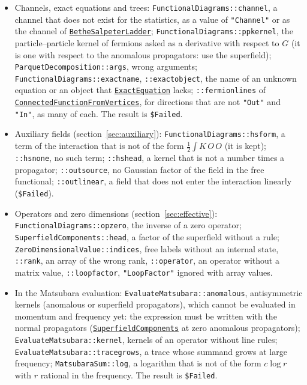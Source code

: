 \documentclass[11pt,a4paper]{article}
\newcommand{\pkg}[1]{\texttt{#1}}
\newcommand{\fnref}[1]{\hyperref[fn:#1]{\pkg{#1}}}
\newcommand{\opt}[1]{\texttt{"#1"}}
\begin{document}
\begin{itemize}
  that are numbers or polynomials in the Feynman parameters, left as it is; \pkg{QEDIntegrand::rule}, \pkg{::external},
  \pkg{::factor}, \pkg{::grassmann}, \pkg{::conservation}, \pkg{::loops}, \pkg{::spinor}, invalid diagrams or rules
  (\pkg{\$Failed}); \pkg{IntegrateOneLoop::loops}, \pkg{::momentum}, \pkg{::numerator}, \pkg{::power}, an integral left
  unevaluated; \pkg{ExpandParameterIntegrals::ir}, \pkg{::failed}, an integral that is not expanded (\pkg{\$Failed});
  \pkg{ParameterIntegral::threshold} and \pkg{SimplexIntegral::threshold}, an integrand with a power $\le-1$ of a base
  that vanishes in the region, above a threshold, which \pkg{N} does not integrate (the result is \pkg{Indeterminate}); \pkg{VertexFormFactors::rest}, a vertex that is not of the form of the form factors
  (\pkg{\$Failed}).
\item Channels, exact equations and trees: \pkg{FunctionalDiagrams::channel}, a channel that does not exist for the
  statistics, as a value of \opt{Channel} or as the channel of \fnref{BetheSalpeterLadder};
  \pkg{FunctionalDiagrams::ppkernel}, the particle--particle kernel of fermions asked as a derivative with respect to $G$
  (it is one with respect to the anomalous propagators: use the superfield);
  \pkg{ParquetDecomposition::args}, wrong arguments; \pkg{FunctionalDiagrams::exactname}, \pkg{::exactobject}, the
  name of an unknown equation or an object that \fnref{ExactEquation} lacks; \pkg{::fermionlines} of
  \fnref{ConnectedFunctionFromVertices}, for directions that are not \pkg{"Out"} and \pkg{"In"}, as many of each. The
  result is \pkg{\$Failed}.
\item Auxiliary fields (section~\ref{sec:auxiliary}): \pkg{FunctionalDiagrams::hsform}, a term of the interaction that is
  not of the form $\frac12\int K\,O\,O$ (it is kept); \pkg{::hsnone}, no such term; \pkg{::hshead}, a kernel that is not a
  number times a propagator; \pkg{::outsource}, no Gaussian factor of the field in the free functional; \pkg{::outlinear},
  a field that does not enter the interaction linearly (\pkg{\$Failed}).
\item Operators and zero dimensions (section~\ref{sec:effective}): \pkg{FunctionalDiagrams::opzero}, the inverse of a
  zero operator; \pkg{SuperfieldComponents::head}, a factor of the superfield without a rule;
  \pkg{ZeroDimensionalValue::indices}, free labels without an internal state, \pkg{::rank}, an array of the wrong rank,
  \pkg{::operator}, an operator without a matrix value, \pkg{::loopfactor}, \opt{LoopFactor} ignored with array values.
\item In the Matsubara evaluation: \pkg{EvaluateMatsubara::anomalous}, antisymmetric kernels (anomalous or superfield
  propagators), which cannot be evaluated in momentum and frequency yet: the expression must be written with the normal
  propagators (\fnref{SuperfieldComponents} at zero anomalous propagators); \pkg{EvaluateMatsubara::kernel}, kernels of an
  operator without line rules; \pkg{EvaluateMatsubara::tracegrows}, a trace whose summand grows at large frequency;
  \pkg{MatsubaraSum::log}, a logarithm that is not of the form $c\log r$ with $r$ rational in the frequency. The result is
  \pkg{\$Failed}.
\end{itemize}
\end{document}
